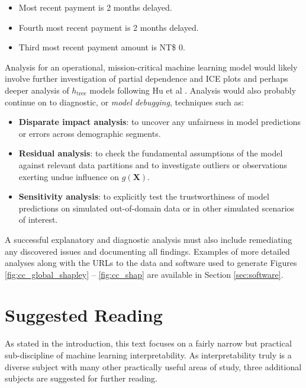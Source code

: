 \documentclass[11pt]{asaproc}
\begin{document}
\begin{itemize}

\item Most recent payment is 2 months delayed.
\item Fourth most recent payment is 2 months delayed.
\item Third most recent payment amount is NT\$ 0.

\end{itemize} 

Analysis for an operational, mission-critical machine learning model would likely involve further investigation of partial dependence and ICE plots and perhaps deeper analysis of $h_{\text{tree}}$ models following Hu et al \cite{lime-sup}. Analysis would also probably continue on to diagnostic, or \textit{model debugging}, techniques such as:

\begin{itemize}

\item \textbf{Disparate impact analysis}: to uncover any unfairness in model predictions or errors across demographic segments.
\item \textbf{Residual analysis}: to check the fundamental assumptions of the model against relevant data partitions and to investigate outliers or observations exerting undue influence on $g(\mathbf{X})$. 
\item \textbf{Sensitivity analysis}: to explicitly test the trustworthiness of model predictions on simulated out-of-domain data or in other simulated scenarios of interest.  

\end{itemize} 

\noindent A successful explanatory and diagnostic analysis must also include remediating any discovered issues and documenting all findings. Examples of more detailed analyses along with the URLs to the data and software used to generate Figures \ref{fig:cc_global_shapley} -- \ref{fig:cc_shap} are available in Section \ref{sec:software}.

\section{Suggested Reading} \label{sec:suggested}

As stated in the introduction, this text focuses on a fairly narrow but practical sub-discipline of machine learning interpretability. As interpretability truly is a diverse subject with many other practically useful areas of study, three additional subjects are suggested for further reading.
\end{document}
